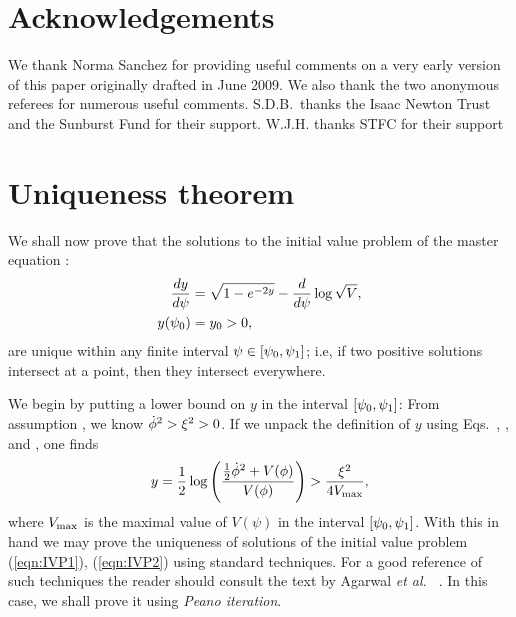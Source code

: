 \section*{Acknowledgements}
We thank Norma Sanchez for providing useful comments on a very early
version of this paper originally drafted in June 2009. We also thank
the two anonymous referees for numerous useful comments. S.D.B.\ thanks
the Isaac Newton Trust and the Sunburst Fund for their support. W.J.H.
thanks STFC for their support




\section{Uniqueness theorem}
\label{sec:uniqueness_theorem}
We shall now prove that the solutions to the initial value problem of
the master equation :
%
\begin{align}
  \frac{dy}{d\psi}
  &=
  \sqrt{1-e^{-2y}} - \frac{d}{d\psi}\log \sqrt V,
  \label{eqn:IVP1}
  \\
  y(\psi_0)
  &=
  y_0>0
  \label{eqn:IVP2},
\end{align}
%
are unique within any finite interval $\psi\in[\psi_0,\psi_1]$; i.e, if
two positive solutions intersect at a point, then they intersect
everywhere.

We begin by putting a lower bound on $y$ in the interval
$[\psi_0,\psi_1]$: From assumption , we know
$\dot{\phi}^2>\xi^2>0$. If we unpack the definition of $y$ using
Eqs.\ , ,  and
, one finds
%
\begin{equation}
  y 
  = 
  \frac{1}{2}\log
  \left(\frac{\frac{1}{2}\dot{\phi}^2 + V(\phi)}{V(\phi)}\right) 
  > 
  \frac{\xi^2}{4V_\mathrm{max}},
\end{equation}
%
where $V_\mathrm{max}$ is the maximal value of $V(\psi)$ in the interval
$[\psi_0,\psi_1]$. With this in hand we may prove the uniqueness of
solutions of the initial value problem (\ref{eqn:IVP1}), (\ref{eqn:IVP2})
using standard techniques. For a good reference of such techniques the
reader should consult the text by Agarwal {\it et al.\ }
\citep{agarwal_1993}. In this case, we shall prove it using {\em Peano
iteration}.


